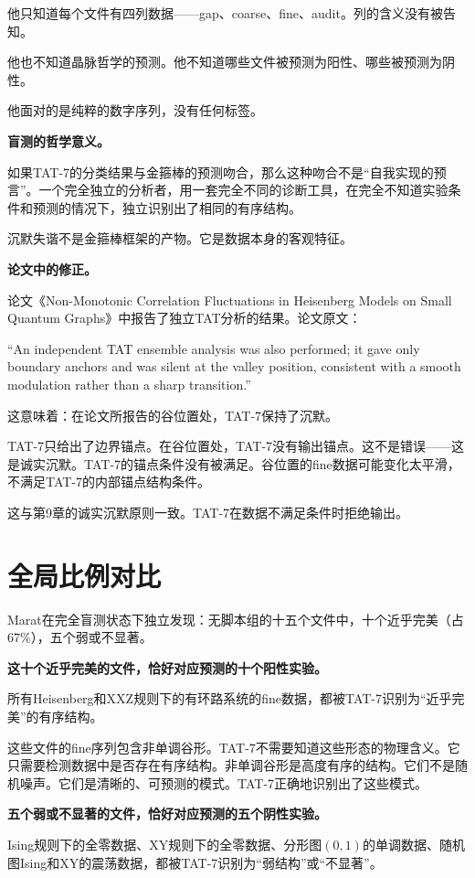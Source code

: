 \documentclass[11pt,a4paper]{book}
\theoremstyle{definition}
\begin{document}
他只知道每个文件有四列数据——gap、coarse、fine、audit。列的含义没有被告知。

他也不知道晶脉哲学的预测。他不知道哪些文件被预测为阳性、哪些被预测为阴性。

他面对的是纯粹的数字序列，没有任何标签。

\textbf{盲测的哲学意义。}

如果TAT-7的分类结果与金箍棒的预测吻合，那么这种吻合不是“自我实现的预言”。一个完全独立的分析者，用一套完全不同的诊断工具，在完全不知道实验条件和预测的情况下，独立识别出了相同的有序结构。

沉默失谐不是金箍棒框架的产物。它是数据本身的客观特征。

\textbf{论文中的修正。}

论文《Non-Monotonic Correlation Fluctuations in Heisenberg Models on Small Quantum Graphs》中报告了独立TAT分析的结果。论文原文：

“An independent TAT ensemble analysis was also performed; it gave only boundary anchors and was silent at the valley position, consistent with a smooth modulation rather than a sharp transition.”

这意味着：在论文所报告的谷位置处，TAT-7保持了沉默。

TAT-7只给出了边界锚点。在谷位置处，TAT-7没有输出锚点。这不是错误——这是诚实沉默。TAT-7的锚点条件没有被满足。谷位置的fine数据可能变化太平滑，不满足TAT-7的内部锚点结构条件。

这与第9章的诚实沉默原则一致。TAT-7在数据不满足条件时拒绝输出。

\section{全局比例对比}

Marat在完全盲测状态下独立发现：无脚本组的十五个文件中，十个近乎完美（占$67\%$），五个弱或不显著。

\textbf{这十个近乎完美的文件，恰好对应预测的十个阳性实验。}

所有Heisenberg和XXZ规则下的有环路系统的fine数据，都被TAT-7识别为“近乎完美”的有序结构。

这些文件的fine序列包含非单调谷形。TAT-7不需要知道这些形态的物理含义。它只需要检测数据中是否存在有序结构。非单调谷形是高度有序的结构。它们不是随机噪声。它们是清晰的、可预测的模式。TAT-7正确地识别出了这些模式。

\textbf{五个弱或不显著的文件，恰好对应预测的五个阴性实验。}

Ising规则下的全零数据、XY规则下的全零数据、分形图$(0,1)$的单调数据、随机图Ising和XY的震荡数据，都被TAT-7识别为“弱结构”或“不显著”。
\end{document}
